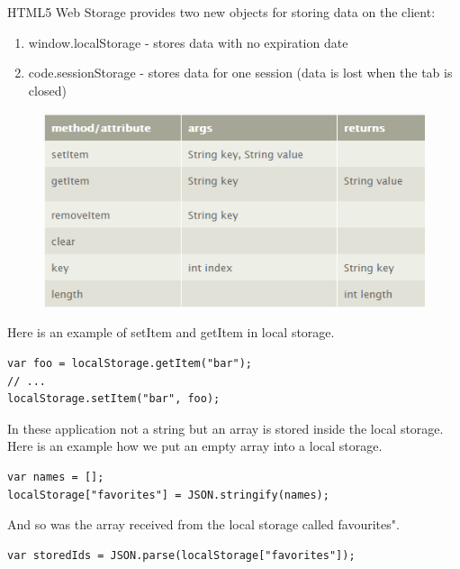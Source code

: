 HTML5 Web Storage provides two new objects for storing data on the client:
\begin{enumerate}
\item window.localStorage - stores data with no expiration date
\item code.sessionStorage - stores data for one session (data is lost when the tab is closed)
\end{enumerate}
\newpage

\begin{figure}[t]
\centering
\includegraphics[width=0.9\linewidth]{graphics/chapter4/20}
\caption{}
\label{fig:4}
\end{figure}


Here is an example of setItem and getItem in local storage.
\\

\begin{lstlisting}[language=html, caption= 
start timer function,captionpos=b]
var foo = localStorage.getItem("bar");
// ...
localStorage.setItem("bar", foo);
\end{lstlisting}

In these application not a string but an array is stored inside the local storage. Here is an example how we put an empty array into a local storage.
\\

\begin{lstlisting}[language=html, caption= 
start timer function,captionpos=b]
var names = [];
localStorage["favorites"] = JSON.stringify(names);
\end{lstlisting}

And so was the array received from the local storage called favourites".
\\
\begin{lstlisting}[language=html, caption= 
start timer function,captionpos=b]
var storedIds = JSON.parse(localStorage["favorites"]);
\end{lstlisting}

